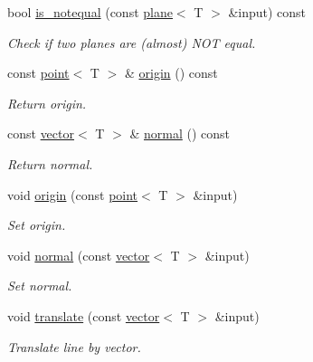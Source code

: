 \begin{DoxyCompactItemize}
bool \hyperlink{classddd_1_1plane_a319553f776b468860662c166c2a9790c}{is\+\_\+notequal} (const \hyperlink{classddd_1_1plane}{plane}$<$ T $>$ \&input) const
\begin{DoxyCompactList}\small\item\em Check if two planes are (almost) N\+OT equal. \end{DoxyCompactList}\item 
\mbox{\label{classddd_1_1plane_af6a195c3b73a20a3b0a02040b79ada07}} 
const \hyperlink{classddd_1_1point}{point}$<$ T $>$ \& \hyperlink{classddd_1_1plane_af6a195c3b73a20a3b0a02040b79ada07}{origin} () const
\begin{DoxyCompactList}\small\item\em Return origin. \end{DoxyCompactList}\item 
\mbox{\label{classddd_1_1plane_a4d4ef359d3b0e904b5441f4d37fc7220}} 
const \hyperlink{classddd_1_1vector}{vector}$<$ T $>$ \& \hyperlink{classddd_1_1plane_a4d4ef359d3b0e904b5441f4d37fc7220}{normal} () const
\begin{DoxyCompactList}\small\item\em Return normal. \end{DoxyCompactList}\item 
void \hyperlink{classddd_1_1plane_ac820ca045c22c4f4672adc9efd8b8cf3}{origin} (const \hyperlink{classddd_1_1point}{point}$<$ T $>$ \&input)
\begin{DoxyCompactList}\small\item\em Set origin. \end{DoxyCompactList}\item 
void \hyperlink{classddd_1_1plane_a938cb0c882eeb20b1b600bb9f89fb039}{normal} (const \hyperlink{classddd_1_1vector}{vector}$<$ T $>$ \&input)
\begin{DoxyCompactList}\small\item\em Set normal. \end{DoxyCompactList}\item 
void \hyperlink{classddd_1_1plane_a452cbfa144468d3748b424b18f045c24}{translate} (const \hyperlink{classddd_1_1vector}{vector}$<$ T $>$ \&input)
\begin{DoxyCompactList}\small\item\em Translate line by vector. \end{DoxyCompactList}\item 

\end{DoxyCompactItemize}
